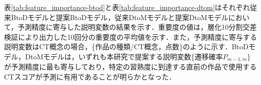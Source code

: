 \documentclass[submit,ses,noauthor]{ipsj}
\begin{document}



表\ref{tab:feature_importance-btod}と表\ref{tab:feature_importance-dtom}はそれぞれ従来BtoDモデルと提案BtoDモデル，従来DtoMモデルと提案DtoMモデルにおいて，予測精度に寄与した説明変数の結果を示す．重要度の値は，層化10分割交差検証により出力した10回分の重要度の平均値を示す．また，予測精度に寄与する説明変数はCT概念の場合，\{作品の種類/CT概念，点数\}のように示す．BtoDモデル，DtoMモデルは，いずれも本研究で提案する説明変数\{遷移確率$P_{m-1,m}$\}が予測精度に最も寄与しており，特定の習熟度に到達する直前の作品で使用するCTスコアが予測に有用であることが明らかとなった．




\end{document}
